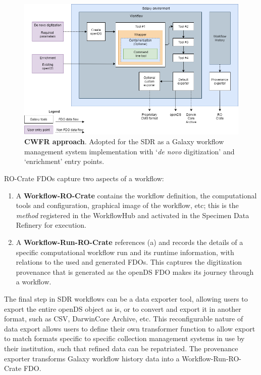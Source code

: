 \begin{figure}%
  \includegraphics[width=\textwidth]{figures/ch08/figure2.png}
	\caption[CWFR approach]{\textbf{CWFR approach}. Adopted for the SDR as a Galaxy 
  workflow management system
  implementation with `\emph{de novo} digitization' and `enrichment' entry points.}
  \label{ch8:figure2}
\end{figure}


RO-Crate FDOs capture two aspects of a workflow:

\begin{enumerate}
\item
  A \textbf{Workflow-RO-Crate} contains the workflow definition, the
  computational tools and configuration, graphical image of the
  workflow, etc; this is the \emph{method} registered in the WorkflowHub
  and activated in the Specimen Data Refinery for execution.
\item
  A \textbf{Workflow-Run-RO-Crate} references (a) and records the
  details of a specific computational workflow run and its runtime
  information, with relations to the used and generated FDOs. This
  captures the digitization provenance that is generated as the openDS
  FDO makes its journey through a workflow.
\end{enumerate}

The final step in SDR workflows can be a data exporter tool, allowing
users to export the entire \acrshort{openDS} object as is, or to convert and export
it in another format, such as \acrshort{CSV}, DarwinCore Archive, etc. This
reconfigurable nature of data export allows users to define their own
transformer function to allow export to match formats specific to
specific collection management systems in use by their institution, such
that refined data can be repatriated. The provenance exporter transforms
Galaxy workflow history data into a Workflow-Run-RO-Crate FDO.

